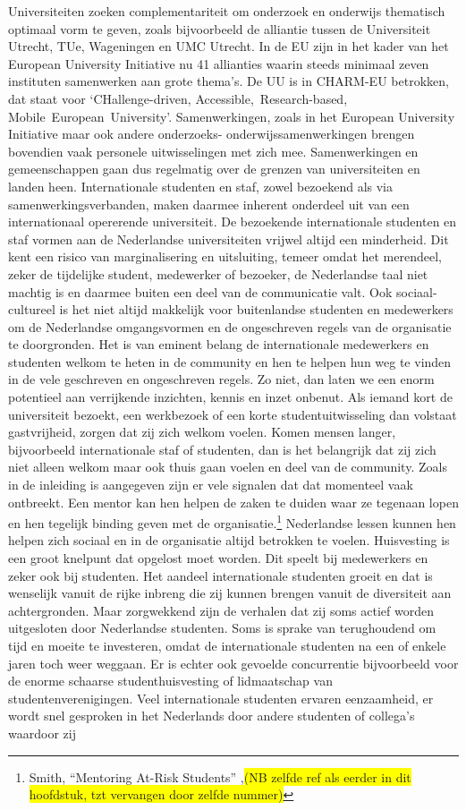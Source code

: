 \documentclass[empirical, authordate, ]{new-jote-article}
\begin{document}
	Universiteiten zoeken complementariteit om onderzoek en onderwijs thematisch optimaal vorm te geven, zoals bijvoorbeeld de alliantie tussen de Universiteit Utrecht, TUe, Wageningen en UMC Utrecht. In de EU zijn in het kader van het European University Initiative nu 41 allianties waarin steeds minimaal zeven instituten samenwerken aan grote thema's. De UU is in CHARM-EU betrokken, dat staat voor ‘CHallenge-driven, Accessible, Research-based, Mobile European University'. Samenwerkingen, zoals in het European University Initiative maar ook andere onderzoeks- onderwijssamenwerkingen brengen bovendien vaak personele uitwisselingen met zich mee. Samenwerkingen en gemeenschappen gaan dus regelmatig over de grenzen van universiteiten en landen heen. Internationale studenten en staf, zowel bezoekend als via samenwerkingsverbanden, maken daarmee inherent onderdeel uit van een internationaal opererende universiteit. De bezoekende internationale studenten en staf vormen aan de Nederlandse universiteiten vrijwel altijd een minderheid. Dit kent een risico van marginalisering en uitsluiting, temeer omdat het merendeel, zeker de tijdelijke student, medewerker of bezoeker, de Nederlandse taal niet machtig is en daarmee buiten een deel van de communicatie valt. Ook sociaal-cultureel is het niet altijd makkelijk voor buitenlandse studenten en medewerkers om de Nederlandse omgangsvormen en de ongeschreven regels van de organisatie te doorgronden. Het is van eminent belang de internationale medewerkers en studenten welkom te heten in de community en hen te helpen hun weg te vinden in de vele geschreven en ongeschreven regels. Zo niet, dan laten we een enorm potentieel aan verrijkende inzichten, kennis en inzet onbenut. Als iemand kort de universiteit bezoekt, een werkbezoek of een korte studentuitwisseling dan volstaat gastvrijheid, zorgen dat zij zich welkom voelen. Komen mensen langer, bijvoorbeeld internationale staf of studenten, dan is het belangrijk dat zij zich niet alleen welkom maar ook thuis gaan voelen en deel van de community. Zoals in de inleiding is aangegeven zijn er vele signalen dat dat momenteel vaak ontbreekt. Een mentor kan hen helpen de zaken te duiden waar ze tegenaan lopen en hen tegelijk binding geven met de organisatie.\footnote{Smith, “Mentoring At-Risk Students” ,\colorbox{yellow}{(NB zelfde ref als eerder in dit hoofdstuk, }\colorbox{yellow}{tzt}\colorbox{yellow}{ vervangen door zelfde nummer)}} Nederlandse lessen kunnen hen helpen zich sociaal en in de organisatie altijd betrokken te voelen. Huisvesting is een groot knelpunt dat opgelost moet worden. Dit speelt bij medewerkers en zeker ook bij studenten. Het aandeel internationale studenten groeit en dat is wenselijk vanuit de rijke inbreng die zij kunnen brengen vanuit de diversiteit aan achtergronden. Maar zorgwekkend zijn de verhalen dat zij soms actief worden uitgesloten door Nederlandse studenten. Soms is sprake van terughoudend om tijd en moeite te investeren, omdat de internationale studenten na een of enkele jaren toch weer weggaan. Er is echter ook gevoelde concurrentie bijvoorbeeld voor de enorme schaarse studenthuisvesting of lidmaatschap van studentenverenigingen. Veel internationale studenten ervaren eenzaamheid, er wordt snel gesproken in het Nederlands door andere studenten of collega's waardoor zij 
\end{document}
